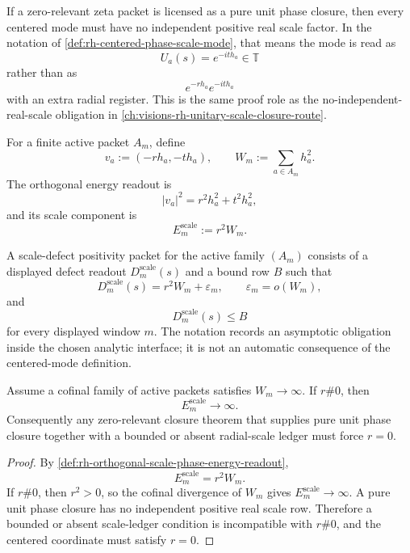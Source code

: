 \begin{principle}
\label{prin:rh-unit-phase-closure-excludes-radial-scale}
If a zero-relevant zeta packet is licensed as a pure unit phase closure,
then every centered mode must have no independent positive real scale
factor. In the notation of \autoref{def:rh-centered-phase-scale-mode},
that means the mode is read as
$$
U_a(s)=e^{-ith_a}\in\mathbb T
$$
rather than as
$$
e^{-rh_a}e^{-ith_a}
$$
with an extra radial register. This is the same proof role as the
no-independent-real-scale obligation in
\autoref{ch:visions-rh-unitary-scale-closure-route}.
\end{principle}

\begin{definition}
\label{def:rh-orthogonal-scale-phase-energy-readout}
For a finite active packet $A_m$, define
$$
v_a:=(-rh_a,-th_a),
\qquad
W_m:=\sum_{a\in A_m}h_a^2.
$$
The orthogonal energy readout is
$$
|v_a|^2=r^2h_a^2+t^2h_a^2,
$$
and its scale component is
$$
E_m^{\mathrm{scale}}:=r^2W_m.
$$
\end{definition}

\begin{definition}
\label{def:rh-scale-defect-positivity-packet}
A scale-defect positivity packet for the active family $(A_m)$ consists
of a displayed defect readout $D_m^{\mathrm{scale}}(s)$ and a bound row
$B$ such that
$$
D_m^{\mathrm{scale}}(s)
=
r^2W_m+\varepsilon_m,
\qquad
\varepsilon_m=o(W_m),
$$
and
$$
D_m^{\mathrm{scale}}(s)\le B
$$
for every displayed window $m$. The notation records an asymptotic
obligation inside the chosen analytic interface; it is not an automatic
consequence of the centered-mode definition.
\end{definition}

\begin{theorem}
\label{thm:rh-cofinal-scale-energy-incompatible-pure-phase}
Assume a cofinal family of active packets satisfies $W_m\to\infty$. If
$r\#0$, then
$$
E_m^{\mathrm{scale}}\to\infty.
$$
Consequently any zero-relevant closure theorem that supplies pure unit
phase closure together with a bounded or absent radial-scale ledger must
force $r=0$.
\end{theorem}

\begin{proof}
By \autoref{def:rh-orthogonal-scale-phase-energy-readout},
$$
E_m^{\mathrm{scale}}=r^2W_m.
$$
If $r\#0$, then $r^2>0$, so the cofinal divergence of $W_m$ gives
$E_m^{\mathrm{scale}}\to\infty$. A pure unit phase closure has no
independent positive real scale row. Therefore a bounded or absent
scale-ledger condition is incompatible with $r\#0$, and the centered
coordinate must satisfy $r=0$.
\end{proof}

